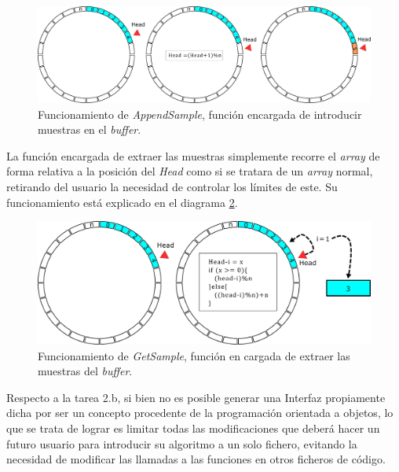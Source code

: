         \begin{figure}[H] 
                \centering
                        \includegraphics[width = \linewidth]{figuras/bufferAppend.png}
                \caption{Funcionamiento de \textit{AppendSample}, función encargada de introducir muestras en el \textit{buffer}.}
                \label{fig:bufferDiagramAppend}
        \end{figure}
        
        La función encargada de extraer las muestras simplemente recorre el \textit{array} de forma relativa a la posición del \textit{Head} como si se tratara de un \textit{array} normal, retirando del usuario la necesidad de controlar los límites de este. Su funcionamiento está explicado en el diagrama \ref{fig:bufferDiagramGet}.
        
        \begin{figure}[H]
                \centering
                        \includegraphics[width = 0.9 \linewidth]{figuras/bufferGet.png}
                \caption{Funcionamiento de \textit{GetSample}, función en cargada de extraer las muestras del \textit{buffer}.}
                \label{fig:bufferDiagramGet}
        \end{figure}
        
        Respecto a la tarea 2.b, si bien no es posible generar una Interfaz propiamente dicha por ser un concepto procedente de la programación orientada a objetos, lo que se trata de lograr es limitar todas las modificaciones que deberá hacer un futuro usuario para introducir su algoritmo a un solo fichero, evitando la necesidad de modificar las llamadas a las funciones en otros ficheros de código. 

